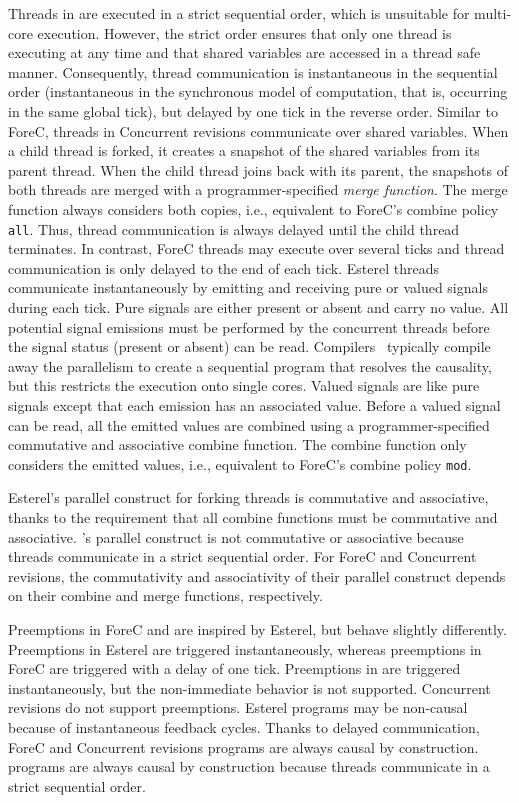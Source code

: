 Threads in \pretc{} are executed in a strict sequential order, 
which is unsuitable for multi-core execution. However, the strict order
ensures that only one thread is executing at any time and 
that shared variables are accessed in a thread safe manner. 
Consequently, thread communication is instantaneous in the 
sequential order (instantaneous in the synchronous model of 
computation, that is, occurring in the same global tick), 
but delayed by one tick in the reverse order.
Similar to ForeC, threads in Concurrent revisions
communicate over shared variables. When a child thread is
forked, it creates a snapshot of the shared variables from its
parent thread. When the child thread joins back with its
parent, the snapshots of both threads are merged with a
programmer-specified \emph{merge function}. The merge function always
considers both copies, i.e., equivalent to ForeC's combine
policy \verb$all$. Thus, thread communication is always
delayed until the child thread terminates. In contrast, 
ForeC threads may execute over several ticks and thread
communication is only delayed to the end of each tick.
Esterel threads communicate instantaneously by emitting and
receiving pure or valued signals during each tick. Pure
signals are either present or absent and carry no value.
All potential signal emissions must be performed by the 
concurrent threads before 
the signal status (present or absent) can be read. 
Compilers~\cite{distributed_reactive_systems_survey,timed_cec,YuanYR11} 
typically compile away the parallelism to create a sequential
program that resolves the causality, but this restricts the 
execution onto single cores.
Valued signals are like pure signals except that each emission
has an associated value. Before a valued signal can be read,
all the emitted values are combined using a
programmer-specified commutative and associative combine
function. The combine function only considers the
emitted values, i.e., equivalent to ForeC's combine policy \texttt{mod}. 

Esterel's parallel construct for forking threads is
commutative and associative, thanks to the requirement that
all combine functions must be commutative and associative.
\pretc{}'s parallel construct is not commutative or associative 
because threads communicate in a strict sequential order.
For ForeC and Concurrent revisions, the commutativity and
associativity of their parallel construct depends on their
combine and merge functions, respectively. 

Preemptions in ForeC and \pretc{} are inspired by
Esterel, but behave slightly differently. Preemptions in
Esterel are triggered instantaneously, whereas preemptions
in ForeC are triggered with a delay of one tick. 
Preemptions in \pretc{} are triggered instantaneously, but 
the non-immediate behavior is not supported.
Concurrent revisions do not support preemptions.
Esterel programs may be non-causal~\cite{timed_synchronous_survey} 
because of instantaneous feedback cycles. Thanks to delayed
communication, ForeC and Concurrent revisions programs are
always causal by construction. \pretc{} programs are always
causal by construction because threads communicate in a 
strict sequential order.


